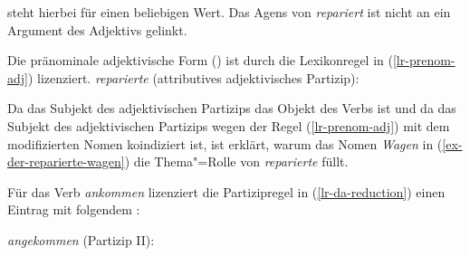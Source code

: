 {\noindent
\etag steht hierbei für einen beliebigen Wert. Das Agens von \emph{repariert} ist nicht an ein
Argument des Adjektivs gelinkt.

Die pränominale adjektivische Form () ist durch die Lexikonregel in (\ref{lr-prenom-adj})
lizenziert.
\eas
{\em reparierte} (attributives adjektivisches Partizip):\\
\zs

\noindent
Da das Subjekt des adjektivischen Partizips das Objekt des Verbs ist und
da das Subjekt des adjektivischen Partizips wegen der Regel (\ref{lr-prenom-adj})
mit dem modifizierten Nomen koindiziert ist, ist erklärt, warum das Nomen \emph{Wagen} 
in (\ref{ex-der-reparierte-wagen}) die Thema"=Rolle von \emph{reparierte} füllt.

Für das Verb \emph{ankommen} lizenziert die Partizipregel in (\ref{lr-da-reduction}) einen Eintrag
mit folgendem \localw:

\eas
\emph{angekommen} (Partizip II):\\
\zs

}
